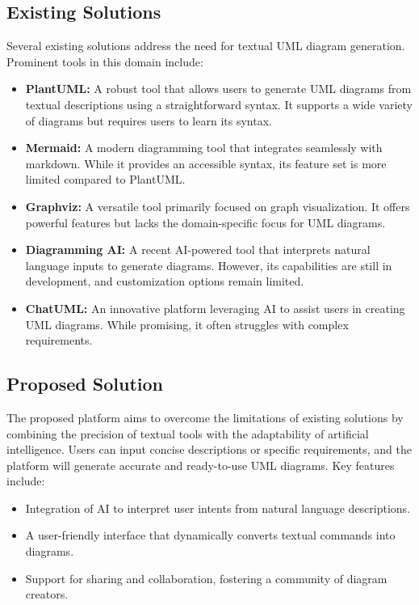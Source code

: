 \subsection{Existing Solutions}
Several existing solutions address the need for textual UML diagram generation. Prominent tools in this domain include:

\begin{itemize}
    \item \textbf{PlantUML:} A robust tool that allows users to generate UML diagrams from textual descriptions using a straightforward syntax. It supports a wide variety of diagrams but requires users to learn its syntax.
    \item \textbf{Mermaid:} A modern diagramming tool that integrates seamlessly with markdown. While it provides an accessible syntax, its feature set is more limited compared to PlantUML.
    \item \textbf{Graphviz:} A versatile tool primarily focused on graph visualization. It offers powerful features but lacks the domain-specific focus for UML diagrams.
    \item \textbf{Diagramming AI:} A recent AI-powered tool that interprets natural language inputs to generate diagrams. However, its capabilities are still in development, and customization options remain limited.
    \item \textbf{ChatUML:} An innovative platform leveraging AI to assist users in creating UML diagrams. While promising, it often struggles with complex requirements.
\end{itemize}

\subsection{Proposed Solution}
The proposed platform aims to overcome the limitations of existing solutions by combining the precision of textual tools with the adaptability of artificial intelligence. Users can input concise descriptions or specific requirements, and the platform will generate accurate and ready-to-use UML diagrams. Key features include:

\begin{itemize}
    \item Integration of AI to interpret user intents from natural language descriptions.
    \item A user-friendly interface that dynamically converts textual commands into diagrams.
    \item Support for sharing and collaboration, fostering a community of diagram creators.
\end{itemize}

